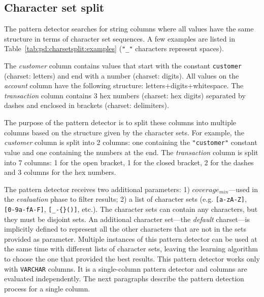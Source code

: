 \subsection{Character set split}
\label{subsec:pd:charsetsplit}



\graphicspath{{5_automatic_learning/pattern_detection/images/}}

% 

The  pattern detector searches for string columns where all values have the same structure in terms of character set sequences. A few examples are listed in Table~\ref{tab:pd:charsetsplit:examples} (\verb|"_"| characters represent spaces).



The \textit{customer} column contains values that start with the constant \verb|customer| (charset: letters) and end with a number (charset: digits). All values on the \textit{account} column have the following structure: letters+digits+whitespace. The \textit{transaction} column contains 3 hex numbers (charset: hex digits) separated by dashes and enclosed in brackets (charset: delimiters).

The purpose of the  pattern detector is to split these columns into multiple columns based on the structure given by the character sets. For example, the \textit{customer} column is split into 2 columns: one containing the \verb|"customer"| constant value and one containing the numbers at the end. The \textit{transaction} column is split into 7 columns: 1 for the open bracket, 1 for the closed bracket, 2 for the dashes and 3 columns for the hex numbers.

The pattern detector receives two additional parameters: 1) \(coverage_{min}\)---used in the \textit{evaluation} phase to filter results; 2) a list of character sets (e.g. \verb|[a-zA-Z]|, \verb|[0-9a-fA-F]|, \verb|[_-{}()]|, etc.). The character sets can contain any characters, but they must be disjoint sets. An additional character set---the \textit{default} charset---is implicitly defined to represent all the other characters that are not in the sets provided as parameter. Multiple instances of this pattern detector can be used at the same time with different lists of character sets, leaving the learning algorithm to choose the one that provided the best results. This pattern detector works only with \verb|VARCHAR| columns. It is a single-column pattern detector and columns are evaluated independently. The next paragraphs describe the pattern detection process for a single column.

